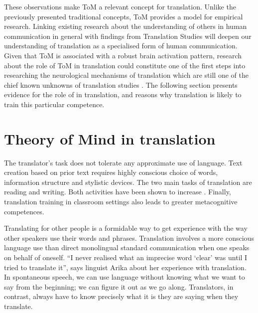 \documentclass[output=paper]{LSP/langsci}
\begin{document}
These observations make ToM a relevant concept for translation. Unlike the previously presented traditional concepts, ToM provides a model for empirical research. Linking existing research about the understanding of others in human communication in general with findings from Translation Studies will deepen our understanding of translation as a specialised form of human communication. Given that ToM is associated with a robust brain activation pattern, research about the role of ToM in translation could constitute one of the first steps into researching the neurological mechanisms of translation which are still one of the chief known unknowns of translation studies \citep[83]{Tymoczko2012}. The following section presents evidence for the role of  in translation, and reasons why translation is likely to train this particular competence. 


\section{Theory of Mind in translation}

The translator's task does not tolerate any approximate use of language. Text creation based on prior text requires highly conscious choice of words, information structure and stylistic devices. The two main tasks of translation are reading and writing. Both activities have been shown to increase . Finally, translation training in classroom settings also leads to greater metacognitive competences.


Translating for other people is a formidable way to get experience with the way other speakers use their words and phrases. Translation involves a more conscious language use than direct monolingual standard communication when one speaks on behalf of oneself. ``I never realised what an imprecise word `clear' was until I tried to translate it'', says linguist Arika \citet[67]{Okrent2010} about her experience with translation. In spontaneous speech, we can use language without knowing what we want to say from the beginning; we can figure it out as we go along. Translators, in contrast, always have to know precisely what it is they are saying when they translate. 
\end{document}

